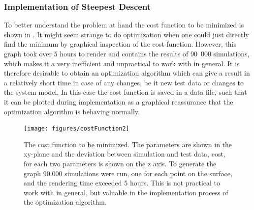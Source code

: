 \subsubsection{Implementation of Steepest Descent}
To better understand the problem at hand the cost function to be minimized is shown in . It might seem strange to do optimization when one could just directly find the minimum by graphical inspection of the cost function. However, this graph took over 5 hours to render and contains the results of \si{90.000} simulations, which makes it a very inefficient and unpractical to work with in general. It is therefore desirable to obtain an optimization algorithm which can give a result in a relatively short time in case of any changes, be it new test data or changes to the system model. In this case the cost function is saved in a data-file, such that it can be plotted during implementation as a graphical reassurance that the optimization algorithm is behaving normally.

\begin{figure}[H]
	\centering
	\texttt{[image: figures/costFunction2]}
	\caption{The cost function to be minimized. The parameters are shown in the xy-plane and the deviation between simulation and test data, cost, for each two parameters is shown on the z axis. To generate the graph 90.000 simulations were run, one for each point on the surface, and the rendering time exceeded 5 hours. This is not practical to work with in general, but valuable in the implementation process of the optimization algorithm.}
	\label{costFunction}
\end{figure}

